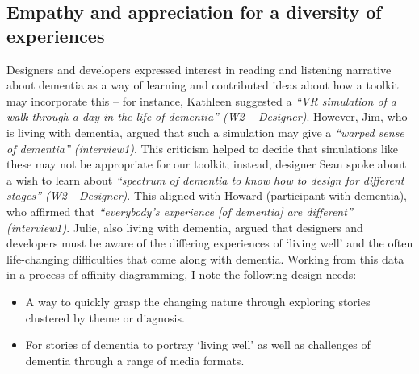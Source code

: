 \subsection{Empathy and appreciation for a diversity of experiences}
Designers and developers expressed interest in reading and listening narrative about dementia as a way of learning and contributed ideas about how a toolkit may incorporate this – for instance, Kathleen suggested a \textit{“VR simulation of a walk through a day in the life of dementia” (W2 – Designer)}. However, Jim, who is living with dementia, argued that such a simulation may give a \textit{“warped sense of dementia” (interview1)}. This criticism helped to decide that simulations like these may not be appropriate for our toolkit; instead, designer Sean spoke about a wish to learn about \textit{“spectrum of dementia to know how to design for different stages” (W2 - Designer)}. This aligned with Howard (participant with dementia), who affirmed that \textit{“everybody’s experience [of dementia] are different” (interview1)}. Julie, also living with dementia, argued that designers and developers must be aware of the differing experiences of ‘living well’ and the often life-changing difficulties that come along with dementia. Working from this data in a process of affinity diagramming, I note the following design needs:
\begin{itemize}
    \item A way to quickly grasp the changing nature through exploring stories clustered by theme or diagnosis.
    \item For stories of dementia to portray ‘living well’ as well as challenges of dementia through a range of media formats.
\end{itemize}


